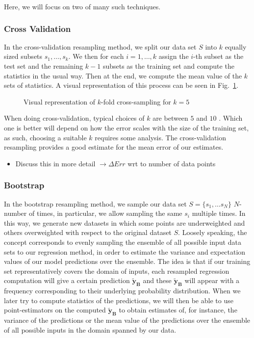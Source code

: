 \documentclass[reprint, english, nofootinbib]{revtex4-2}
\begin{document}
        Here, we will focus on two of many such techniques.

        \subsubsection{Cross Validation}
            \noindent
            In the cross-validation resampling method, we split our data set $S$ into $k$ equally sized subsets $s_1, \dots, s_k$.
            We then for each $i = 1,\dots, k$ assign the $i$-th subset as the test set and the remaining $k-1$ subsets as the training set and compute the statistics in the usual way. Then at the end, we compute the mean value of the $k$ sets of statistics. A visual representation of this process can be seen in Fig.~\ref{fig: Cross Validation}.
            \begin{figure}[h!tb]
                \center
                
                \caption{\label{fig: Cross Validation}Visual representation of $k$-fold cross-sampling for $k=5$}
            \end{figure}
            When doing cross-validation, typical choices of $k$ are between  $5$ and $10$ \cite{hastie}. Which one is better will depend on how the error scales with the size of the training set, as such, choosing a suitable $k$ requires some analysis.
            The cross-validation resampling provides a good estimate for the mean error of our estimates.
            \begin{itemize}
                \item Discuss this in more detail $\rightarrow\Delta Err$ wrt to number of data points
            \end{itemize}
        \subsubsection{Bootstrap}
            \noindent
            In the bootstrap resampling method, we sample our data set $S = \{s_1, \dots s_N\}$ $N$-number of times, in particular, we allow sampling the same $s_i$ multiple times. In this way, we generate new datasets in which some points are underweighted and others overweighted with respect to the original dataset $S$. Loosely speaking, the concept corresponds to evenly sampling the ensemble of all possible input data sets to our regression method, in order to estimate the variance and expectation values of our model predictions over the ensemble. The idea is that if our training set representatively covers the domain of inputs, each resampled regression computation will give a certain prediction $\pmb{\tilde{y}_{B}}$ and these $\pmb{\tilde{y}_{B}}$ will appear with a frequency corresponding to their  underlying probability distribution. When we later try to compute statistics of the predictions, we will then be able to use point-estimators on the computed $\pmb{\tilde{y}_{B}}$ to obtain estimates of, for instance, the variance of the predictions or the mean value of the predictions over the ensemble of all possible inputs in the domain spanned by our data.
            
\end{document}
